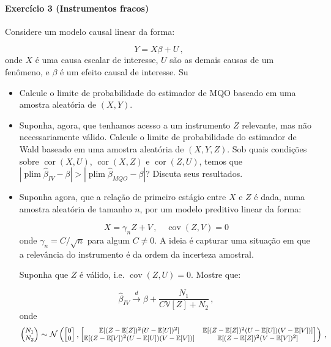 \documentclass[10pt,a4paper]{article}
\begin{document}
	\paragraph{Exercício 3 (Instrumentos fracos)} Considere um modelo causal linear da forma:

$$Y = X \beta + U\, ,$$
onde $X$ é uma causa escalar de interesse, $U$ são as demais causas de um fenômeno, e $\beta$ é um efeito causal de interesse. Su

\begin{itemize}
	\item[a] Calcule o limite de probabilidade do estimador de MQO baseado em uma amostra aleatória de $(X,Y)$.
	\item[b] Suponha, agora, que tenhamos acesso a um instrumento $Z$ relevante, mas não necessariamente válido. Calcule o limite de probabilidade do estimador de Wald baseado em uma amostra aleatória de $(X,Y,Z)$. Sob quais condições sobre $ \operatorname{cor}(X,U)$, $\operatorname{cor}(X,Z)$ e $\operatorname{cor}(Z,U)$, temos que $|\operatorname{plim}\hat \beta_{IV} -\beta|  > |\operatorname{plim}\hat \beta_{MQO} -\beta| $? Discuta seus resultados.
	
	\item[c] Suponha agora, que a relação de primeiro estágio entre $X$ e $Z$ é dada, numa amostra aleatória de tamanho $n$, por um modelo preditivo linear da forma:
	
	$$X = \gamma_n Z + V\, , \quad \operatorname{cov}(Z,V)=0$$
	onde $\gamma_n = C/\sqrt{n}$ para algum $C \neq 0$. A ideia é capturar uma situação em que a relevância do instrumento é da ordem da incerteza amostral.
	
	Suponha que $Z$ é válido, i.e. $\operatorname{cov}(Z,U)=0$. Mostre que:
	
	$$\hat{\beta}_{IV} \overset{d}{\to} \beta + \frac{N_1}{C\mathbb{V}[Z] + N_2}\, , $$
	onde $$\footnotesize \begin{pmatrix}
	N_1 \\
	N_2
	\end{pmatrix}  \sim \mathcal{N}\left(\begin{bmatrix}
	0 \\
	0
	\end{bmatrix}, \begin{bmatrix}
	\mathbb{E}[(Z-\mathbb{E}[Z])^2 (U  - \mathbb{E}[U])^2] & 	\mathbb{E}[(Z-\mathbb{E}[Z])^2 (U  - \mathbb{E}[U])(V-\mathbb{E}[V])] \\
	\mathbb{E}[(Z-\mathbb{E}[V])^2 (U  - \mathbb{E}[U]) (V-\mathbb{E}[V])] & 	\mathbb{E}[(Z-\mathbb{E}[Z])^2 (V  - \mathbb{E}[V])^2] 
	\end{bmatrix}\right)\, ,$$
	

\end{itemize}
\end{document}
